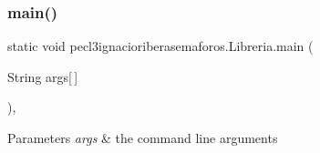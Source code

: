 \subsubsection{\texorpdfstring{main()}{main()}}
{\footnotesize\ttfamily static void pecl3ignacioriberasemaforos.\+Libreria.\+main (\begin{DoxyParamCaption}\item[{String}]{args\mbox{[}$\,$\mbox{]} }\end{DoxyParamCaption})\hspace{0.3cm}{\ttfamily [inline]}, {\ttfamily [static]}}


\begin{DoxyParams}{Parameters}
{\em args} & the command line arguments \\
\hline
\end{DoxyParams}

